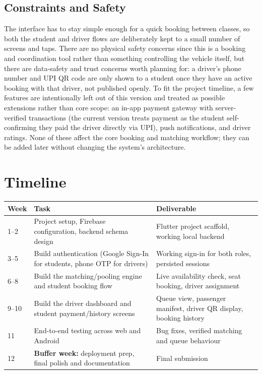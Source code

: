 \documentclass[11pt]{article}
\begin{document}
\subsection{Constraints and Safety}
The interface has to stay simple enough for a quick booking between classes, so both the student and driver flows are deliberately kept to a small number of screens and taps. There are no physical safety concerns since this is a booking and coordination tool rather than something controlling the vehicle itself, but there are data-safety and trust concerns worth planning for: a driver's phone number and UPI QR code are only shown to a student once they have an active booking with that driver, not published openly. To fit the project timeline, a few features are intentionally left out of this version and treated as possible extensions rather than core scope: an in-app payment gateway with server-verified transactions (the current version treats payment as the student self-confirming they paid the driver directly via UPI), push notifications, and driver ratings. None of these affect the core booking and matching workflow; they can be added later without changing the system's architecture.

\section{Timeline}
\begin{center}
\begin{tabular}{@{}p{1.6cm}p{6.2cm}p{6.2cm}@{}}
\toprule
\textbf{Week} & \textbf{Task} & \textbf{Deliverable} \\
\midrule
1--2 & Project setup, Firebase configuration, backend schema design & Flutter project scaffold, working local backend \\
3--5 & Build authentication (Google Sign-In for students, phone OTP for drivers) & Working sign-in for both roles, persisted sessions \\
6--8 & Build the matching/pooling engine and student booking flow & Live availability check, seat booking, driver assignment \\
9--10 & Build the driver dashboard and student payment/history screens & Queue view, passenger manifest, driver QR display, booking history \\
11 & End-to-end testing across web and Android & Bug fixes, verified matching and queue behaviour \\
12 & \textbf{Buffer week:} deployment prep, final polish and documentation & Final submission \\
\bottomrule
\end{tabular}
\end{center}
\end{document}
